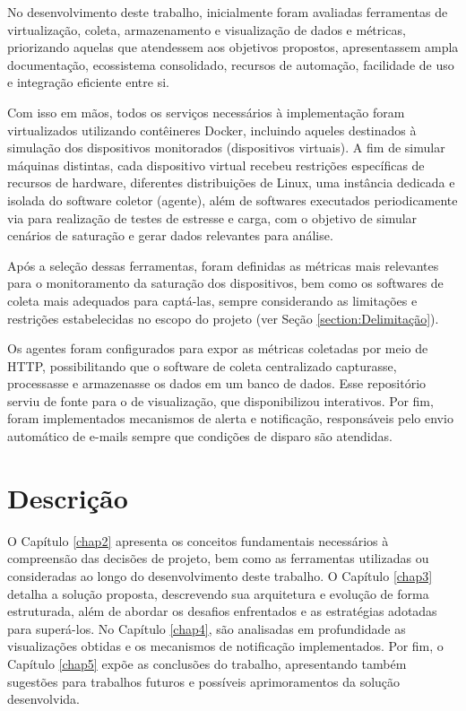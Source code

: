 No desenvolvimento deste trabalho, inicialmente foram avaliadas ferramentas de virtualização, coleta, armazenamento e visualização de dados e métricas, priorizando aquelas que atendessem aos objetivos propostos, apresentassem ampla documentação, ecossistema consolidado, recursos de automação, facilidade de uso e integração eficiente entre si.

Com isso em mãos, todos os serviços necessários à implementação foram virtualizados utilizando contêineres Docker, incluindo aqueles destinados à simulação dos dispositivos monitorados (dispositivos virtuais). A fim de simular máquinas distintas, cada dispositivo virtual recebeu restrições específicas de recursos de hardware, diferentes distribuições de Linux, uma instância dedicada e isolada do software coletor (agente), além de softwares executados periodicamente via  para realização de testes de estresse e carga, com o objetivo de simular cenários de saturação e gerar dados relevantes para análise.

Após a seleção dessas ferramentas, foram definidas as métricas mais relevantes para o monitoramento da saturação dos dispositivos, bem como os softwares de coleta mais adequados para captá-las, sempre considerando as limitações e restrições estabelecidas no escopo do projeto (ver Seção \ref{section:Delimitação}).

Os agentes foram configurados para expor as métricas coletadas por meio de  HTTP, possibilitando que o software de coleta centralizado capturasse, processasse e armazenasse os dados em um banco de dados. Esse repositório serviu de fonte para o  de visualização, que disponibilizou  interativos. Por fim, foram implementados mecanismos de alerta e notificação, responsáveis pelo envio automático de e-mails sempre que condições de disparo são atendidas.

\newpage

\section{Descrição}
\label{section:Descricao}

O Capítulo \ref{chap2} apresenta os conceitos fundamentais necessários à compreensão das decisões de projeto, bem como as ferramentas utilizadas ou consideradas ao longo do desenvolvimento deste trabalho. O Capítulo \ref{chap3} detalha a solução proposta, descrevendo sua arquitetura e evolução de forma estruturada, além de abordar os desafios enfrentados e as estratégias adotadas para superá-los. No Capítulo \ref{chap4}, são analisadas em profundidade as visualizações obtidas e os mecanismos de notificação implementados. Por fim, o Capítulo \ref{chap5} expõe as conclusões do trabalho, apresentando também sugestões para trabalhos futuros e possíveis aprimoramentos da solução desenvolvida.
